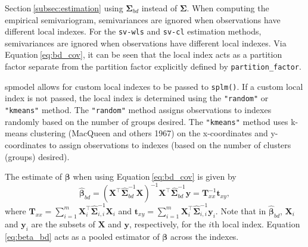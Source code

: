 \documentclass{article}
\begin{document}
Section\(~\)\ref{subsec:estimation} using \(\boldsymbol{\Sigma}_{bd}\)
instead of \(\boldsymbol{\Sigma}\). When computing the empirical
semivariogram, semivariances are ignored when observations have
different local indexes. For the \texttt{sv-wls} and \texttt{sv-cl}
estimation methods, semivariances are ignored when observations have
different local indexes. Via Equation\(~\)\ref{eq:bd_cov}, it can be
seen that the local index acts as a partition factor separate from the
partition factor explicitly defined by \texttt{partition\_factor}.

spmodel allows for custom local indexes to be passed to \texttt{splm()}.
If a custom local index is not passed, the local index is determined
using the \texttt{"random"} or \texttt{"kmeans"} method. The
\texttt{"random"} method assigns observations to indexes randomly based
on the number of groups desired. The \texttt{"kmeans"} method uses
k-means clustering (MacQueen and others 1967) on the x-coordinates and
y-coordinates to assign observations to indexes (based on the number of
clusters (groups) desired).

The estimate of \(\boldsymbol{\beta}\) when using
Equation\(~\)\ref{eq:bd_cov} is given by
\begin{equation}\label{eq:beta_bd}
  \hat{\boldsymbol{\beta}}_{bd} = (\mathbf{X}^\top \boldsymbol{\hat{\Sigma}}^{-1}_{bd}\mathbf{X})^{-1}\mathbf{X}^\top \boldsymbol{\hat{\Sigma}}^{-1}_{bd} \mathbf{y} = \mathbf{T}^{-1}_{xx}\mathbf{t}_{xy},
\end{equation} where
\(\mathbf{T}_{xx} = \sum_{i = 1}^m \mathbf{X}_i^\top \boldsymbol{\hat{\Sigma}}^{-1}_{i, i}\mathbf{X}_i\)
and
\(\mathbf{t}_{xy} = \sum_{i = 1}^m \mathbf{X}_i^\top \hat{\boldsymbol{\Sigma}}^{-1}_{i, i} \mathbf{y}_i\).
Note that in \(\hat{\boldsymbol{\beta}}_{bd}\), \(\mathbf{X}_i\) and
\(\mathbf{y}_i\) are the subsets of \(\mathbf{X}\) and \(\mathbf{y}\),
respectively, for the \(i\)th local index. Equation\(~\)\ref{eq:beta_bd}
acts as a pooled estimator of \(\boldsymbol{\beta}\) across the indexes.
\end{document}
